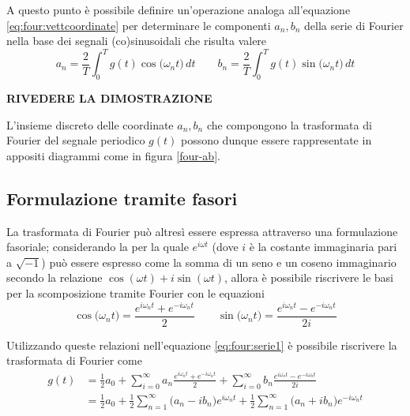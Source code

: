 	A questo punto è possibile definire un'operazione analoga all'equazione \ref{eq:four:vettcoordinate} per determinare le componenti $a_n,b_n$ della serie di Fourier nella base dei segnali (co)sinusoidali che risulta valere
	\begin{equation} \label{eq:four:temp2}
		a_n = \frac 2 T \int_0^T g(t) \cos\big(\omega_n t\big) \, dt \qquad b_n = \frac 2 T \int_0^T g(t) \sin\big(\omega_n t\big) \, dt
	\end{equation}
	
	\textbf{RIVEDERE LA DIMOSTRAZIONE}
	
	L'insieme discreto delle coordinate $a_n,b_n$ che compongono la trasformata di Fourier del segnale periodico $g(t)$ possono dunque essere rappresentate in appositi diagrammi come in figura \ref{four-ab}.
	
	
	
	\subsection{Formulazione tramite fasori}
	La trasformata di Fourier può altresì essere espressa attraverso una formulazione fasoriale; considerando la  per la quale $e^{i\omega t}$ (dove $i$ è la costante immaginaria pari a $\sqrt{-1}$) può essere espresso come la somma di un seno e un coseno immaginario secondo la relazione $\cos(\omega t) + i\sin(\omega t)$, allora è possibile riscrivere le basi per la scomposizione tramite Fourier con le equazioni
	\[ \cos\big(\omega_n t\big) = \frac{e^{i\omega_nt} + e^{-i\omega_n t}}{2} \qquad \sin\big(\omega_n t\big) = \frac{e^{i\omega_nt}-e^{-i\omega_nt}}{2i} \]
	
	Utilizzando queste relazioni nell'equazione \ref{eq:four:serie1} è possibile riscrivere la trasformata di Fourier come
	\begin{equation} \label{eq:four:temp1}
		\begin{split}
		g(t) & = \frac 1 2 a_0 + \sum_{i=0}^\infty a_n \frac{e^{i\omega_n t} + e^{-i\omega_n t}}{2} + \sum_{i=0}^\infty b_n \frac{e^{i\omega_n t} - e^{-i\omega_n t}}{2i} \\
		& = \frac 1 2 a_0 + \frac 1 2 \sum_{n=1}^\infty \big(a_n - i b_n\big)e^{i\omega_nt} + \frac 1 2 \sum_{n=1}^\infty \big(a_n + i b_n\big) e^{-i\omega_nt}
		\end{split}
	\end{equation}
	
